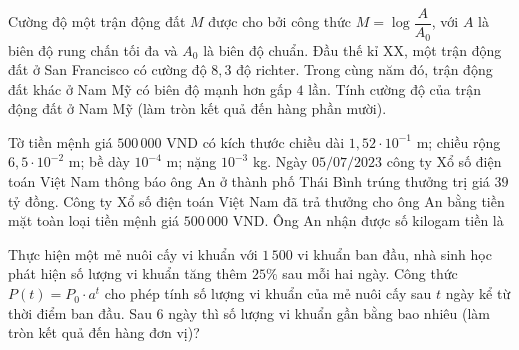 \begin{ex}%
	Cường độ một trận động đất $M$ được cho bởi công thức $M=\log\dfrac{A}{A_0}$, với $A$ là  biên độ rung chấn tối đa và $A_0$ là biên độ chuẩn. Đầu thế kỉ XX, một trận động đất ở San Francisco có cường độ $8{,}3$ độ richter. Trong cùng năm đó, trận động đất khác ở Nam Mỹ có biên độ mạnh hơn gấp $4$ lần. Tính cường độ của trận động đất ở Nam Mỹ (làm tròn kết quả đến hàng phần mười).
\end{ex}

\begin{ex}%
	Tờ tiền mệnh giá $500\,000$ VND có kích thước chiều dài $1{,}52\cdot 10^{-1}$ m; chiều rộng $6{,}5\cdot 10^{-2}$ m; bề dày $10^{-4}$ m; nặng $10^{-3}$ kg. Ngày $05/07/2023$ công ty Xổ số điện toán Việt Nam thông báo ông An ở thành phố  Thái Bình trúng thưởng trị giá $39$ tỷ đồng. Công ty Xổ số điện toán Việt Nam đã trả thưởng cho ông An bằng tiền mặt toàn loại tiền mệnh giá $500\,000$ VND. Ông An nhận được số kilogam tiền là
\end{ex}

\begin{ex}%
	Thực hiện một mẻ nuôi cấy vi khuẩn  với $1\,500$ vi khuẩn ban đầu, nhà sinh học phát hiện số lượng vi khuẩn tăng thêm $25\%$ sau mỗi hai ngày. Công thức $P(t)=P_0\cdot a^t$ cho phép tính số lượng vi khuẩn của mẻ nuôi cấy sau $t$ ngày kể từ thời điểm ban đầu. Sau $6$ ngày thì số lượng vi khuẩn gần bằng bao nhiêu (làm tròn kết quả đến hàng đơn vị)?
\end{ex}

